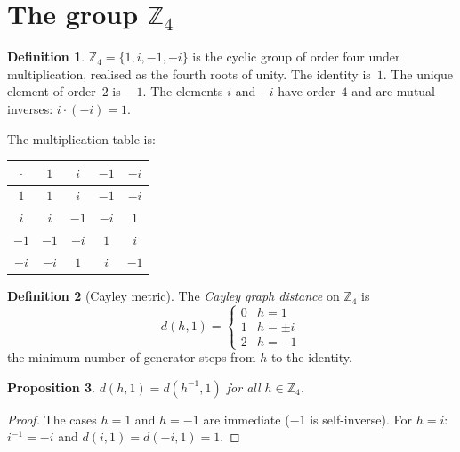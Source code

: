 \documentclass[11pt,a4paper]{article}
\theoremstyle{definition}
\newtheorem{definition}{Definition}[section]
\theoremstyle{plain}
\newtheorem{proposition}[definition]{Proposition}
\theoremstyle{remark}
\newcommand{\Zf}{\mathbb{Z}_4}
\begin{document}
\section{The group $\Zf$}\label{sec:Z4}

\begin{definition}\label{def:Z4}
  $\Zf = \{1, i, -1, -i\}$ is the cyclic group of order four under multiplication, realised as the fourth roots of unity.  The identity is~$1$.  The unique element of order~$2$ is~$-1$.  The elements $i$ and $-i$ have order~$4$ and are mutual inverses: $i \cdot (-i) = 1$.
\end{definition}

The multiplication table is:
\begin{center}
  \begin{tabular}{c|cccc}
    $\cdot$ & $1$ & $i$ & $-1$ & $-i$ \\
    \hline
    $1$  & $1$ & $i$ & $-1$ & $-i$ \\
    $i$  & $i$ & $-1$ & $-i$ & $1$ \\
    $-1$ & $-1$ & $-i$ & $1$ & $i$ \\
    $-i$ & $-i$ & $1$ & $i$ & $-1$ \\
  \end{tabular}
\end{center}

\begin{definition}[Cayley metric]\label{def:cayley}
  The \emph{Cayley graph distance} on $\Zf$ is
  \begin{equation}\label{eq:cayley}
    d(h, 1) =
    \begin{cases} 0 & h = 1 \\ 1 & h = \pm i \\ 2 & h = -1
    \end{cases}
  \end{equation}
  the minimum number of generator steps from $h$ to the identity.
\end{definition}

\begin{proposition}\label{prop:symm}
  $d(h, 1) = d(h^{-1}, 1)$ for all $h \in \Zf$.
\end{proposition}

\begin{proof}
  The cases $h = 1$ and $h = -1$ are immediate ($-1$ is self-inverse).  For $h = i$: $i^{-1} = -i$ and $d(i, 1) = d(-i, 1) = 1$.
\end{proof}
\end{document}
